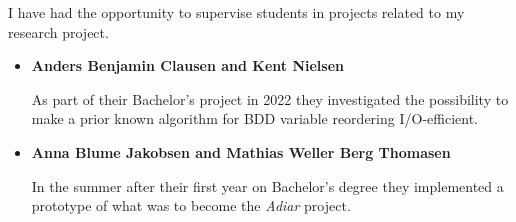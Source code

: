 
I have had the opportunity to supervise students in projects related to my research
project.

\medskip

\begin{itemize}
\item \textbf{Anders Benjamin Clausen and Kent Nielsen}

  As part of their Bachelor's project in 2022 they investigated the possibility to 
  make a prior known algorithm for BDD variable reordering I/O-efficient.

\item \textbf{Anna Blume Jakobsen and Mathias Weller Berg Thomasen}

  In the summer after their first year on Bachelor's degree they implemented a
  prototype of what was to become the \emph{Adiar} project.
\end{itemize}
